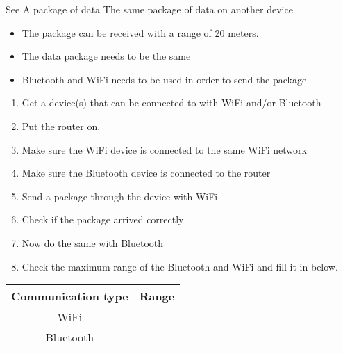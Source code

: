 {See }
{A package of data}
{The same package of data on another device}
{\begin{itemize}
    \item The package can be received with a range of 20 meters.
    \item The data package needs to be the same
    \item Bluetooth and WiFi needs to be used in order to send the package
\end{itemize}}
{\begin{enumerate}
    \item Get a device(s) that can be connected to with WiFi and/or Bluetooth
    \item Put the router on.
    \item Make sure the WiFi device is connected to the same WiFi  network
    \item Make sure the Bluetooth device is connected to the router
    \item Send a package through the device with WiFi
    \item Check if the package arrived correctly
    \item Now do the same with Bluetooth
    \item Check the maximum range of the Bluetooth and WiFi and fill it in below.
\end{enumerate}

\begin{tabular}{c|c}
    Communication type & Range \\\hline
    \multirow{2}{3em}{WiFi} & \\& \underline{\hspace{3cm}}\\
    \multirow{2}{4em}{Bluetooth} &\\& \underline{\hspace{3cm}}\\
\end{tabular}}


